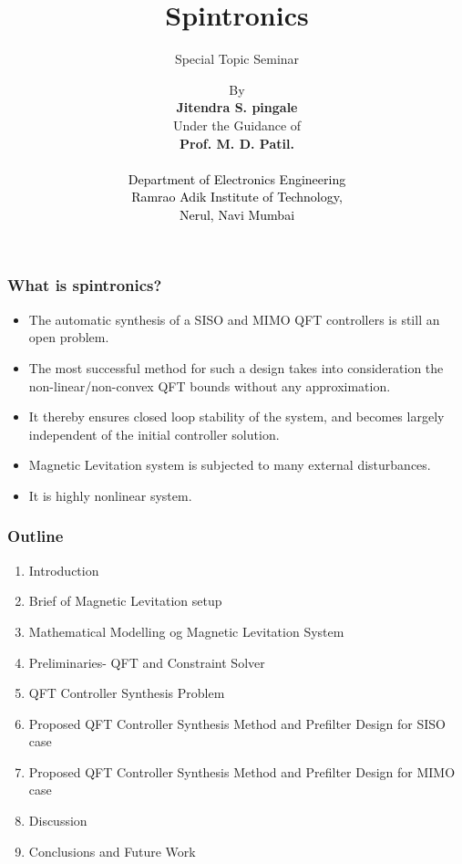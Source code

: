 \documentclass{beamer}
\title{Spintronics}
\subtitle{Special Topic Seminar}
\begin{document}
\author[SysCon] {By \\ \vspace{0.05in} \textbf{Jitendra S. pingale } \\ \vspace{0.01in} {Under the Guidance of} \\ \textbf{Prof. M. D. Patil. }\\
\textcolor{black}{ \\ Department of Electronics Engineering} \\ \textcolor{black}{Ramrao Adik Institute of Technology,\\ Nerul, Navi Mumbai } \\
}

\begin{frame}
\begin{center}
\end{center}
\titlepage
\end{frame}

\begin{frame}
\frametitle{What is spintronics?}
\begin{itemize}
\item {The automatic synthesis of a SISO and MIMO QFT controllers is still
an open problem.}
\item {The most successful method for such a design takes
into consideration the non-linear/non-convex QFT bounds without any
approximation.}
\item {It thereby ensures closed loop stability of the
system, and becomes largely independent of the initial controller
solution.}
\item {Magnetic Levitation system is subjected to many external
disturbances.}
\item {It is highly nonlinear system.}
\end{itemize}
\end{frame}


\begin{frame}
\frametitle{Outline}
\begin{enumerate}
\item {Introduction}
\item {Brief of Magnetic Levitation setup}
\item {Mathematical Modelling og Magnetic Levitation System}
\item {Preliminaries- QFT and Constraint Solver}
\item {QFT Controller Synthesis Problem}
\item {Proposed QFT Controller Synthesis Method and Prefilter Design  for SISO case}
\item {Proposed QFT Controller Synthesis Method and Prefilter Design  for MIMO case}
\item {Discussion}
\item {Conclusions and Future Work}
\end{enumerate}
\end{frame}
\end{document}

